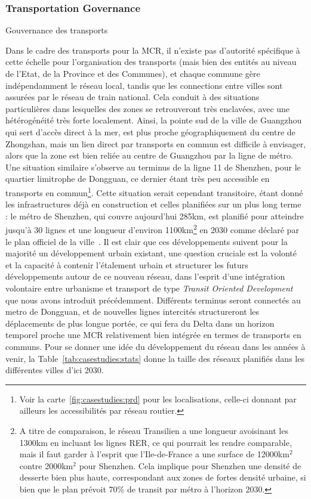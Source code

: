 \subsubsection{Transportation Governance}{Gouvernance des transports}

\bpar{}
{
 Dans le cadre des transports pour la MCR, il n'existe pas d'autorité spécifique à cette échelle pour l'organisation des transports (mais bien des entités au niveau de l'Etat, de la Province et des Communes), et chaque commune gère indépendamment le réseau local, tandis que les connections entre villes sont assurées par le réseau de train national. Cela conduit à des situations particulières dans lesquelles des zones se retrouveront très enclavées, avec une hétérogénéité très forte localement. Ainsi, la pointe sud de la ville de Guangzhou qui sert d'accès direct à la mer, est plus proche géographiquement du centre de Zhongshan, mais un lien direct par transports en commun est difficile à envisager, alors que la zone est bien reliée au centre de Guangzhou par la ligne de métro. Une situation similaire s'observe au terminus de la ligne 11 de Shenzhen, pour le quartier limitrophe de Dongguan, ce dernier étant très peu accessible en transports en commun\footnote{Voir la carte~\ref{fig:casestudies:prd} pour les localisations, celle-ci donnant par ailleurs les accessibilités par réseau routier.}. Cette situation serait cependant transitoire, étant donné les infrastructures déjà en construction et celles planifiées sur un plus long terme : le métro de Shenzhen, qui couvre aujourd'hui 285km, est planifié pour atteindre jusqu'à 30 lignes et une longueur d'environ 1100km\footnote{A titre de comparaison, le réseau Transilien a une longueur avoisinant les 1300km en incluant les lignes RER, ce qui pourrait les rendre comparable, mais il faut garder à l'esprit que l'Ile-de-France a une surface de 12000km$^2$ contre 2000km$^2$ pour Shenzhen. Cela implique pour Shenzhen une densité de desserte bien plus haute, correspondant aux zones de fortes densité urbaine, si bien que le plan prévoit 70\% de transit par métro à l'horizon 2030.} en 2030 comme déclaré par le plan officiel de la ville~\cite{shenzhen2016plan}. Il est clair que ces développements suivent pour la majorité un développement urbain existant, une question cruciale est la volonté et la capacité à contenir l'étalement urbain et structurer les futurs développements autour de ce nouveau réseau, dans l'esprit d'une intégration volontaire entre urbanisme et transport de type \emph{Transit Oriented Development} que nous avons introduit précédemment. Différents terminus seront connectés au metro de Dongguan, et de nouvelles lignes intercités structureront les déplacements de plus longue portée, ce qui fera du Delta dans un horizon temporel proche une MCR relativement bien intégrée en termes de transports en communs. Pour se donner une idée du développement du réseau dans les années à venir, la Table~\ref{tab:casestudies:stats} donne la taille des réseaux planifiés dans les différentes villes d'ici 2030.
}

